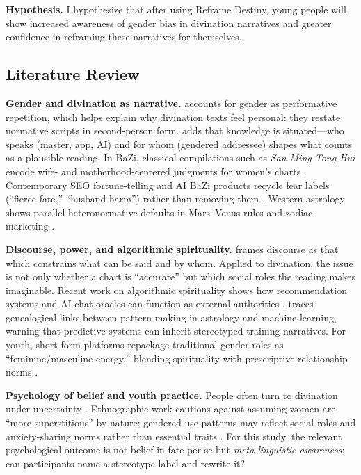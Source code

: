 \documentclass[stu,12pt,floatsintext]{apa7}
\begin{document}
\textbf{Hypothesis.} I hypothesize that after using Reframe Destiny, young people will show increased awareness of gender bias in divination narratives and greater confidence in reframing these narratives for themselves.

\subsection{Literature Review}

\textbf{Gender and divination as narrative.}
\textcite{butler1990} accounts for gender as performative repetition, which helps explain why divination texts feel personal: they restate normative scripts in second-person form. \textcite{haraway1988} adds that knowledge is situated---who speaks (master, app, AI) and for whom (gendered addressee) shapes what counts as a plausible reading. In BaZi, classical compilations such as \textit{San Ming Tong Hui} encode wife- and motherhood-centered judgments for women's charts \parencite{ctext_sanming}. Contemporary SEO fortune-telling and AI BaZi products recycle fear labels (``fierce fate,'' ``husband harm'') rather than removing them \parencite{tencent2025}. Western astrology shows parallel heteronormative defaults in Mars--Venus rules and zodiac marketing \parencite{thisisgendered_zodiac}.

\textbf{Discourse, power, and algorithmic spirituality.}
\textcite{foucault1972} frames discourse as that which constrains what can be said and by whom. Applied to divination, the issue is not only whether a chart is ``accurate'' but which social roles the reading makes imaginable. Recent work on algorithmic spirituality shows how recommendation systems and AI chat oracles can function as external authorities \parencite{cotter2022,cearns2024}. \textcite{nikolic2023} traces genealogical links between pattern-making in astrology and machine learning, warning that predictive systems can inherit stereotyped training narratives. For youth, short-form platforms repackage traditional gender roles as ``feminine/masculine energy,'' blending spirituality with prescriptive relationship norms \parencite{teenVogue2022}.

\textbf{Psychology of belief and youth practice.}
People often turn to divination under uncertainty \parencite{vyse2018}. Ethnographic work cautions against assuming women are ``more superstitious'' by nature; gendered use patterns may reflect social roles and anxiety-sharing norms rather than essential traits \parencite{xing2019}. For this study, the relevant psychological outcome is not belief in fate per se but \emph{meta-linguistic awareness}: can participants name a stereotype label and rewrite it?
\end{document}
